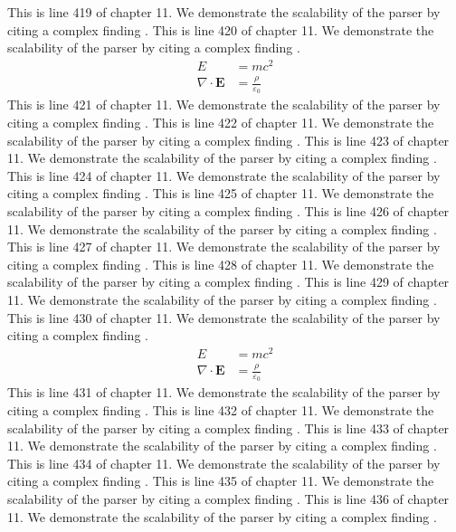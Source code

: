 This is line 419 of chapter 11. We demonstrate the scalability of the parser by citing a complex finding \cite{ref11_419}.
This is line 420 of chapter 11. We demonstrate the scalability of the parser by citing a complex finding \cite{ref11_420}.
\begin{align*}
  E &= mc^2 \\
  \nabla \cdot \mathbf{E} &= \frac{\rho}{\varepsilon_0}
\end{align*}
This is line 421 of chapter 11. We demonstrate the scalability of the parser by citing a complex finding \cite{ref11_421}.
This is line 422 of chapter 11. We demonstrate the scalability of the parser by citing a complex finding \cite{ref11_422}.
This is line 423 of chapter 11. We demonstrate the scalability of the parser by citing a complex finding \cite{ref11_423}.
This is line 424 of chapter 11. We demonstrate the scalability of the parser by citing a complex finding \cite{ref11_424}.
This is line 425 of chapter 11. We demonstrate the scalability of the parser by citing a complex finding \cite{ref11_425}.
This is line 426 of chapter 11. We demonstrate the scalability of the parser by citing a complex finding \cite{ref11_426}.
This is line 427 of chapter 11. We demonstrate the scalability of the parser by citing a complex finding \cite{ref11_427}.
This is line 428 of chapter 11. We demonstrate the scalability of the parser by citing a complex finding \cite{ref11_428}.
This is line 429 of chapter 11. We demonstrate the scalability of the parser by citing a complex finding \cite{ref11_429}.
This is line 430 of chapter 11. We demonstrate the scalability of the parser by citing a complex finding \cite{ref11_430}.
\begin{align*}
  E &= mc^2 \\
  \nabla \cdot \mathbf{E} &= \frac{\rho}{\varepsilon_0}
\end{align*}
This is line 431 of chapter 11. We demonstrate the scalability of the parser by citing a complex finding \cite{ref11_431}.
This is line 432 of chapter 11. We demonstrate the scalability of the parser by citing a complex finding \cite{ref11_432}.
This is line 433 of chapter 11. We demonstrate the scalability of the parser by citing a complex finding \cite{ref11_433}.
This is line 434 of chapter 11. We demonstrate the scalability of the parser by citing a complex finding \cite{ref11_434}.
This is line 435 of chapter 11. We demonstrate the scalability of the parser by citing a complex finding \cite{ref11_435}.
This is line 436 of chapter 11. We demonstrate the scalability of the parser by citing a complex finding \cite{ref11_436}.
